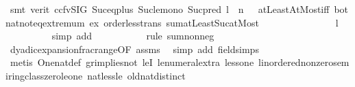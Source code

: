 \begin{isabellebody}
\ {\isacharparenleft}{\kern0pt}smt\ {\isacharparenleft}{\kern0pt}verit{\isacharcomma}{\kern0pt}\ ccfv{\isacharunderscore}{\kern0pt}SIG{\isacharparenright}{\kern0pt}\ Suc{\isacharunderscore}{\kern0pt}eq{\isacharunderscore}{\kern0pt}plus{}\ Suc{\isacharunderscore}{\kern0pt}le{\isacharunderscore}{\kern0pt}mono\ Suc{\isacharunderscore}{\kern0pt}pred{\isacharprime}{\kern0pt}\ {\isacartoucheopen}l\ {\isasymin}\ {\isacharbraceleft}{\kern0pt}{}{\isachardot}{\kern0pt}{\isachardot}{\kern0pt}n\ {\isacharminus}{\kern0pt}\ {}{\isacharbraceright}{\kern0pt}{\isacartoucheclose}\ atLeastAtMost{\isacharunderscore}{\kern0pt}iff\ bot{\isacharunderscore}{\kern0pt}nat{\isacharunderscore}{\kern0pt}{}{\isachardot}{\kern0pt}not{\isacharunderscore}{\kern0pt}eq{\isacharunderscore}{\kern0pt}extremum\ ex\ order{\isacharunderscore}{\kern0pt}less{\isacharunderscore}{\kern0pt}trans\ sum{\isachardot}{\kern0pt}atLeast{\isacharunderscore}{\kern0pt}Suc{\isacharunderscore}{\kern0pt}atMost{\isacharparenright}{\kern0pt}\isanewline
\ \ \ \ \ \ \isamarkupfalse%
\ \isamarkupfalse%
\ {\isachardoublequoteopen}{\isachardot}{\kern0pt}{\isachardot}{\kern0pt}{\isachardot}{\kern0pt}\ {\isasymge}\ {}\ {\isacharslash}{\kern0pt}\ {}\ {\isacharcircum}{\kern0pt}\ {\isacharparenleft}{\kern0pt}l{\isacharplus}{\kern0pt}{}{\isacharparenright}{\kern0pt}{\isachardoublequoteclose}\isanewline
\ \ \ \ \ \ \ \ \isamarkupfalse%
\ {\isacharparenleft}{\kern0pt}simp\ add{\isacharcolon}{\kern0pt}\ {}{\isacharparenright}{\kern0pt}\isanewline
\ \ \ \ \ \ \ \ \isamarkupfalse%
\ {\isacharparenleft}{\kern0pt}rule\ sum{\isacharunderscore}{\kern0pt}nonneg{\isacharparenright}{\kern0pt}\isanewline
\ \ \ \ \ \ \ \ \isamarkupfalse%
\ dyadic{\isacharunderscore}{\kern0pt}expansion{\isacharunderscore}{\kern0pt}frac{\isacharunderscore}{\kern0pt}range{\isacharbrackleft}{\kern0pt}OF\ assms{\isacharparenleft}{\kern0pt}{}{\isacharparenright}{\kern0pt}{\isacharbrackright}{\kern0pt}\ \isamarkupfalse%
\ {\isacharparenleft}{\kern0pt}simp\ add{\isacharcolon}{\kern0pt}\ field{\isacharunderscore}{\kern0pt}simps{\isacharparenright}{\kern0pt}\isanewline
\ \ \ \ \ \ \ \ \isamarkupfalse%
\ {\isacharparenleft}{\kern0pt}metis\ One{\isacharunderscore}{\kern0pt}nat{\isacharunderscore}{\kern0pt}def\ gr{\isacharunderscore}{\kern0pt}implies{\isacharunderscore}{\kern0pt}not{}\ leI\ le{\isacharunderscore}{\kern0pt}numeral{\isacharunderscore}{\kern0pt}extra{\isacharparenleft}{\kern0pt}{}{\isacharparenright}{\kern0pt}\ less{\isacharunderscore}{\kern0pt}one\ linordered{\isacharunderscore}{\kern0pt}nonzero{\isacharunderscore}{\kern0pt}semiring{\isacharunderscore}{\kern0pt}class{\isachardot}{\kern0pt}zero{\isacharunderscore}{\kern0pt}le{\isacharunderscore}{\kern0pt}one\ nat{\isacharunderscore}{\kern0pt}less{\isacharunderscore}{\kern0pt}le\ old{\isachardot}{\kern0pt}nat{\isachardot}{\kern0pt}distinct{\isacharparenleft}{\kern0pt}{}{\isacharparenright}{\kern0pt}{\isacharparenright}{\kern0pt}\isanewline

\end{isabellebody}
